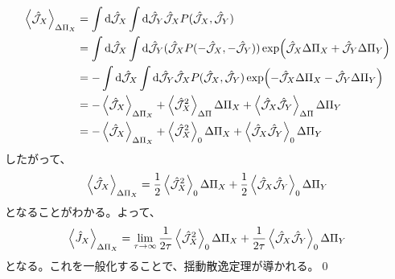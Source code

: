 \documentclass[a4paper,11pt]{jsarticle}
\numberwithin{equation}{section}
\begin{document}
\begin{align}
  \ev{\hat{\mathcal{J}}_X}_{\Delta\Pi_X} &= \int \dd \hat{\mathcal{J}}_X \int \dd \hat{\mathcal{J}}_Y \hat{\mathcal{J}}_X P(\hat{\mathcal{J}}_X, \hat{\mathcal{J}}_Y)\\
  &= \int \dd \hat{\mathcal{J}}_X \int \dd \hat{\mathcal{J}}_Y (\hat{\mathcal{J}}_X P(-\hat{\mathcal{J}}_X, -\hat{\mathcal{J}}_Y))\exp(\hat{\mathcal{J}}_X \Delta \Pi_X + \hat{\mathcal{J}}_Y \Delta \Pi_Y)\\
  &= -\int \dd \hat{\mathcal{J}}_X \int \dd \hat{\mathcal{J}}_Y \hat{\mathcal{J}}_X P(\hat{\mathcal{J}}_X, \hat{\mathcal{J}}_Y)\exp(-\hat{\mathcal{J}}_X \Delta \Pi_X - \hat{\mathcal{J}}_Y \Delta \Pi_Y)\\
  &= -\ev{\hat{\mathcal{J}}_X }_{\Delta \Pi_X} + \ev{\hat{\mathcal{J}}_X^2}_{\Delta \Pi} \Delta \Pi_X + \ev{\hat{\mathcal{J}}_X \hat{\mathcal{J}}_Y}_{\Delta \Pi} \Delta \Pi_Y\\
  &= -\ev{\hat{\mathcal{J}}_X }_{\Delta \Pi_X} + \ev{\hat{\mathcal{J}}_X^2}_{0} \Delta \Pi_X + \ev{\hat{\mathcal{J}}_X \hat{\mathcal{J}}_Y}_{0} \Delta \Pi_Y
\end{align}
したがって、
\begin{align}
  \ev{\hat{\mathcal{J}}_X }_{\Delta \Pi_X} = \frac{1}{2}\ev{\hat{\mathcal{J}}_X^2}_{0} \Delta \Pi_X + \frac{1}{2}\ev{\hat{\mathcal{J}}_X \hat{\mathcal{J}}_Y}_{0} \Delta \Pi_Y
\end{align}
となることがわかる。よって、
\begin{align}
  \ev{\hat{{J}}_X }_{\Delta \Pi_X} = \lim_{\tau \to \infty}\frac{1}{2\tau}\ev{\hat{\mathcal{J}}_X^2}_{0} \Delta \Pi_X + \frac{1}{2\tau}\ev{\hat{\mathcal{J}}_X \hat{\mathcal{J}}_Y}_{0} \Delta \Pi_Y
\end{align}
となる。これを一般化することで、揺動散逸定理が導かれる。\qed\\
\end{document}
